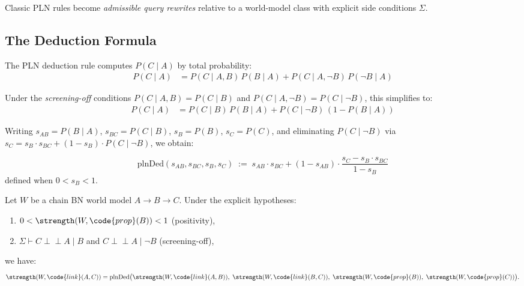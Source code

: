 \documentclass[11pt,openany]{report}
\begin{document}
Classic PLN rules become \emph{admissible query rewrites} relative to a
world-model class with explicit side conditions $\Sigma$.

\subsection{The Deduction Formula}

The PLN deduction rule computes $P(C \mid A)$ by total probability:
\begin{align}
  P(C \mid A) &= P(C \mid A, B)\,P(B \mid A) + P(C \mid A, \lnot B)\,P(\lnot B \mid A)
  \label{eq:total-prob}
\end{align}

Under the \emph{screening-off} conditions
$P(C \mid A, B) = P(C \mid B)$ and
$P(C \mid A, \lnot B) = P(C \mid \lnot B)$, this simplifies to:
\begin{align}
  P(C \mid A) &= P(C \mid B)\,P(B \mid A)
    + P(C \mid \lnot B)\,(1 - P(B \mid A))
  \label{eq:deduction-screened}
\end{align}

Writing $s_{AB} = P(B \mid A)$, $s_{BC} = P(C \mid B)$, $s_B = P(B)$,
$s_C = P(C)$, and eliminating $P(C \mid \lnot B)$ via
$s_C = s_B \cdot s_{BC} + (1 - s_B) \cdot P(C \mid \lnot B)$, we obtain:

\begin{definition}
\label{def:deduction-strength}
\[
  \mathrm{plnDed}(s_{AB}, s_{BC}, s_B, s_C) \;:=\;
  s_{AB} \cdot s_{BC} + (1 - s_{AB}) \cdot \frac{s_C - s_B \cdot s_{BC}}{1 - s_B}
\]
defined when $0 < s_B < 1$.
\end{definition}

\begin{theorem}
\label{thm:chain-deduction}
Let $W$ be a chain BN world model $A \to B \to C$.  Under the explicit
hypotheses:
\begin{enumerate}
\item[(i)] $0 < \strength(W, \code{prop}(B)) < 1$ \quad (positivity),
\item[(ii)] $\Sigma \vdash C \perp\!\!\!\perp A \mid B$ and
  $C \perp\!\!\!\perp A \mid \lnot B$ \quad (screening-off),
\end{enumerate}
we have:
\[
  \strength(W, \code{link}(A, C)) = \mathrm{plnDed}\big(
    \strength(W, \code{link}(A, B)),\;
    \strength(W, \code{link}(B, C)),\;
    \strength(W, \code{prop}(B)),\;
    \strength(W, \code{prop}(C))
  \big).
\]
\end{theorem}
\end{document}
